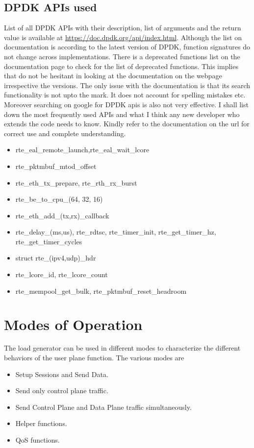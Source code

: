 \documentclass{article}
\begin{document}
\subsection{DPDK APIs used}
List of all DPDK APIs with their description, list of arguments and the return value is available at \url{https://doc.dpdk.org/api/index.html}. Although the list on documentation is according to the latest version of DPDK, function signatures do not change across implementations. There is a deprecated functions list on the documentation page to check for the list of deprecated functions. This implies that do not be hesitant in looking at the documentation on the webpage irrespective  the versions. The only issue with the documentation is that its search functionality is not upto the mark. It does not account for spelling mistakes etc. Moreover searching on google for DPDK apis is also not very effective. 
 I shall list down the most frequently used APIs and what I think any new developer who extends the code needs to know. Kindly refer to  the documentation on the url for correct use and complete understanding. 
\begin{itemize}
    \item rte\_eal\_remote\_launch,rte\_eal\_wait\_lcore
    \item rte\_pktmbuf\_mtod\_offset
    \item rte\_eth\_tx\_prepare, rte\_rth\_rx\_burst
    \item rte\_be\_to\_cpu\_(64, 32, 16)
    \item rte\_eth\_add\_(tx,rx)\_callback
    \item rte\_delay\_(ms,us), rte\_rdtsc, rte\_timer\_init, rte\_get\_timer\_hz, rte\_get\_timer\_cycles
    \item struct rte\_(ipv4,udp)\_hdr
    \item rte\_lcore\_id, rte\_lcore\_count   
    \item rte\_mempool\_get\_bulk, rte\_pktmbuf\_reset\_headroom 
\end{itemize}
\section{Modes of Operation}
The load generator can be used in different modes to characterize the different behaviors of the user plane function. The various modes are 
\begin{itemize}
    \item Setup Sessions and Send Data.
    \item Send only control plane traffic.
    \item Send Control Plane and Data Plane traffic simultaneously.
    \item Helper functions.
    \item QoS functions.
\end{itemize}
\end{document}
